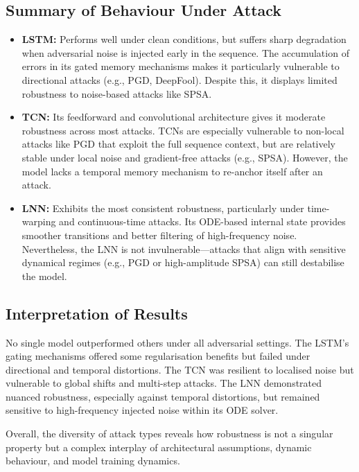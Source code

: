 \subsection{Summary of Behaviour Under Attack}

\begin{itemize}
    \item \textbf{LSTM:} Performs well under clean conditions, but suffers sharp degradation when adversarial noise is injected early in the sequence. The accumulation of errors in its gated memory mechanisms makes it particularly vulnerable to directional attacks (e.g., PGD, DeepFool). Despite this, it displays limited robustness to noise-based attacks like SPSA.
    
    \item \textbf{TCN:} Its feedforward and convolutional architecture gives it moderate robustness across most attacks. TCNs are especially vulnerable to non-local attacks like PGD that exploit the full sequence context, but are relatively stable under local noise and gradient-free attacks (e.g., SPSA). However, the model lacks a temporal memory mechanism to re-anchor itself after an attack.

    \item \textbf{LNN:} Exhibits the most consistent robustness, particularly under time-warping and continuous-time attacks. Its ODE-based internal state provides smoother transitions and better filtering of high-frequency noise. Nevertheless, the LNN is not invulnerable—attacks that align with sensitive dynamical regimes (e.g., PGD or high-amplitude SPSA) can still destabilise the model.
\end{itemize}

\subsection*{Interpretation of Results}
No single model outperformed others under all adversarial settings. The LSTM's gating mechanisms offered some regularisation benefits but failed under directional and temporal distortions. The TCN was resilient to localised noise but vulnerable to global shifts and multi-step attacks. The LNN demonstrated nuanced robustness, especially against temporal distortions, but remained sensitive to high-frequency injected noise within its ODE solver.

Overall, the diversity of attack types reveals how robustness is not a singular property but a complex interplay of architectural assumptions, dynamic behaviour, and model training dynamics.

